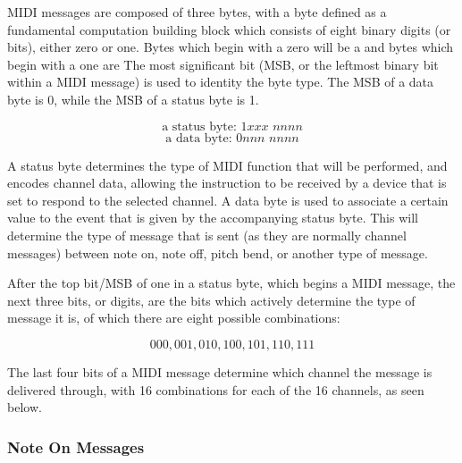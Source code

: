 MIDI messages are composed of three bytes, with a byte defined as a fundamental computation building block which consists of eight binary digits (or bits), either zero or one. Bytes which begin with a zero will be a  and bytes which begin with a one are  The most significant bit (MSB, or the leftmost binary bit within a MIDI message) is used to identity the byte type. The MSB of a data byte is 0, while the MSB of a status byte is 1.

\[\textrm{a status byte: } \textit{1xxx nnnn} \] \[\textrm{a data byte: } \textit{0nnn nnnn} \]

A status byte determines the type of MIDI function that will be performed, and encodes channel data, allowing the instruction to be received by a device that is set to respond to the selected channel. A data byte is used to associate a certain value to the event that is given by the accompanying status byte. This will determine the type of message that is sent (as they are normally channel messages) between note on, note off, pitch bend, or another type of message.

After the top bit/MSB of one in a status byte, which begins a MIDI message, the next three bits, or digits, are the bits which actively determine the type of message it is, of which there are eight possible combinations:

\[000, 001, 010, 100, 101, 110, 111 \]

The last four bits of a MIDI message determine which channel the message is delivered through, with 16 combinations for each of the 16 channels, as seen below. %

\subsubsection{Note On Messages}

